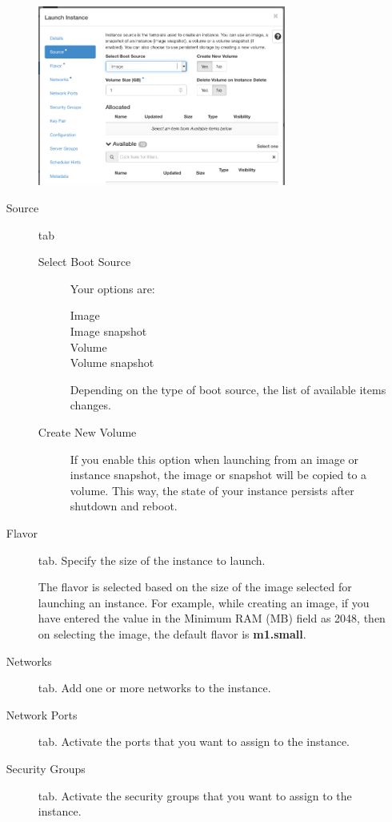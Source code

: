 \begin{enumerate}
\begin{description}
    \begin{center}
      \includegraphics[width=0.7\textwidth]{img/launch_instance_source}
    \end{center}
  \item[Source] tab
  \begin{description}
  \item[Select Boot Source] Your options are:
    \begin{description}
    \item[Image]
    \item[Image snapshot]
    \item[Volume]
    \item[Volume snapshot]
    \end{description}
    Depending on the type of boot source, the list of available items
    changes.

  \item[Create New Volume] If you enable this option when launching
    from an image or instance snapshot, the image or snapshot will be
    copied to a volume.  This way, the state of your instance persists
    after shutdown and reboot.
  \end{description}

\item[Flavor] tab. Specify the size of the instance to launch.

   The flavor is selected based on the size of the image
  selected for launching an instance. For example, while creating an
  image, if you have entered the value in the Minimum RAM (MB) field
  as 2048, then on selecting the image, the default flavor is
  \textbf{m1.small}.

\item[Networks] tab. Add one or more networks to the instance.

\item[Network Ports] tab. Activate the ports that you want to assign to
  the instance.
\item[Security Groups] tab. Activate the security groups that you want
  to assign to the instance.


\end{description}
\end{enumerate}
